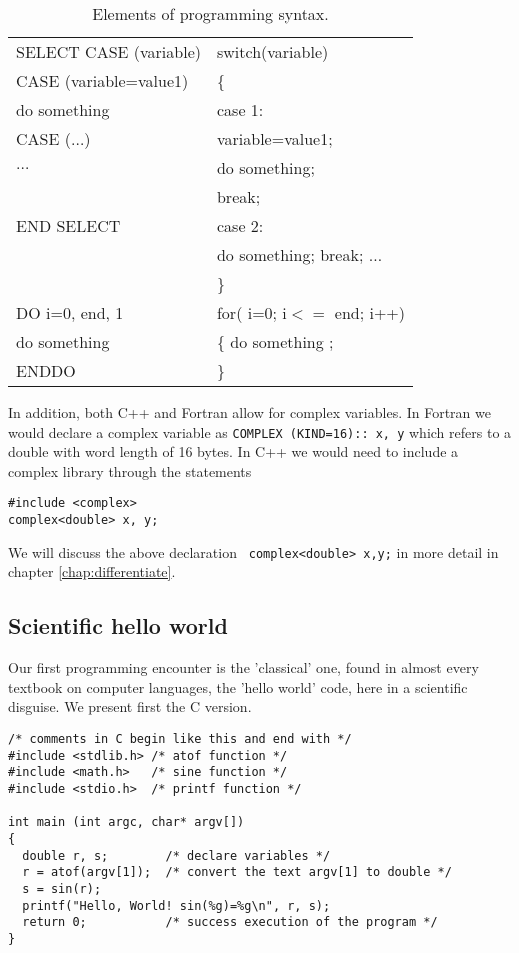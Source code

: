\begin{table}[hbtp]
\begin{tabular}{ll}
SELECT CASE (variable) &      switch(variable)\\
CASE (variable=value1)&       \{ \\
do something             &     case 1: \\
CASE ($\dots$)          & variable=value1;\\
$\dots$  &              do something; \\
&                       break;\\
END SELECT               & case 2:\\
&                       do something; break; $\dots$\\
&                       \}\\ \hline
DO i=0, end, 1  &      for( i=0; i$<=$ end; i++)\\
do something  &        \{ do something ; \\
ENDDO  &               \}\\\hline\hline
\hline\end{tabular}\caption{Elements of programming syntax.}\end{table}

In addition, both C++ and Fortran  allow for complex variables.
In Fortran  we would declare a complex variable as
{\tt COMPLEX (KIND=16):: x, y} which refers to a double with
word length of 16 bytes. In C++ we would need to include a complex
library through the statements

\begin{lstlisting}
#include <complex>
complex<double> x, y;
\end{lstlisting}
We will discuss the above declaration \verb? complex<double> x,y;? in
more detail in chapter \ref{chap:differentiate}. 

\subsection{Scientific hello world}
Our first  programming encounter is the 'classical' one, found in almost every
textbook on computer languages, the 'hello world' code, here in a scientific disguise. 
We present first the C version.
\begin{lstlisting}[title={\url{http://folk.uio.no/mhjensen/compphys/programs/chapter02/cpp/program1.cpp}}]
/* comments in C begin like this and end with */
#include <stdlib.h> /* atof function */
#include <math.h>   /* sine function */
#include <stdio.h>  /* printf function */

int main (int argc, char* argv[])
{
  double r, s;        /* declare variables */
  r = atof(argv[1]);  /* convert the text argv[1] to double */
  s = sin(r);
  printf("Hello, World! sin(%g)=%g\n", r, s);
  return 0;           /* success execution of the program */
}
\end{lstlisting}

